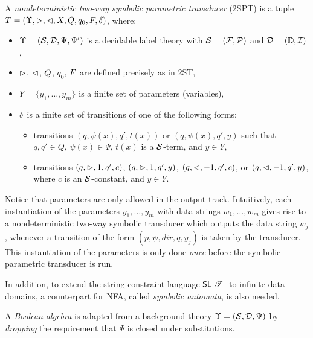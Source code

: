 \begin{definition}
A \emph{nondeterministic two-way symbolic parametric transducer} (2SPT) is a tuple
$T=(\Upsilon, \vartriangleright, \vartriangleleft, X, Q, q_0, F, \delta)$, where:
\begin{itemize}
\item $\Upsilon=(\mathcal{S},\mathcal{D}, \Psi, \Psi')$ is a decidable label theory with $\mathcal{S} = ({\mathcal{F}}, {\mathcal{P}})$ and $\mathcal{D} = (\mathbb{D}, \mathcal{I})$,
%
\item $\vartriangleright$, $\vartriangleleft$, $Q$, $q_0$, $F$ are defined precisely as in 2ST, 
%
\item $Y=\{y_1,\ldots, y_m\}$ is a finite set of parameters (variables), 
%
\item $\delta$ is a finite set of transitions of one of the following forms: 
\begin{itemize}
\item transitions $(q, \psi(x), q', t(x))$ or $(q, \psi(x), q', y)$ such that $q,q' \in Q$, $\psi(x) \in \Psi$,
$t(x)$ is a $\mathcal{S}$-term, and $y \in Y$,
%
\item transitions $(q, \vartriangleright, 1, q', c)$, $(q, \vartriangleright, 1, q', y)$, $(q, \vartriangleleft, -1, q', c)$,  or $(q, \vartriangleleft, -1, q', y)$, where $c$ is an $\mathcal{S}$-constant, and $y \in Y$. 
\end{itemize}
\end{itemize}
\end{definition}

Notice that parameters are only allowed in the output track.
Intuitively, each instantiation of the parameters $y_1,\ldots, y_m$ with data strings 
$w_1,\ldots, w_m$ gives rise to a nondeterministic two-way symbolic transducer which outputs
the data string $w_j$, whenever a transition of the form $(p, \psi, dir, q, y_j)$ is
taken by the transducer. This instantiation of the parameters is only done 
\emph{once} before the symbolic parametric transducer is run.

In addition, to extend the string constraint language $\textsf{SL}[\mathscr{T}]$ to infinite data domains, a counterpart for NFA, called \emph{symbolic automata}, is also needed. 

A \emph{Boolean algebra} is adapted from a background theory $\Upsilon=(\mathcal{S},\mathcal{D}, \Psi)$ by \emph{dropping} the requirement that $\Psi$ is closed under substitutions.

